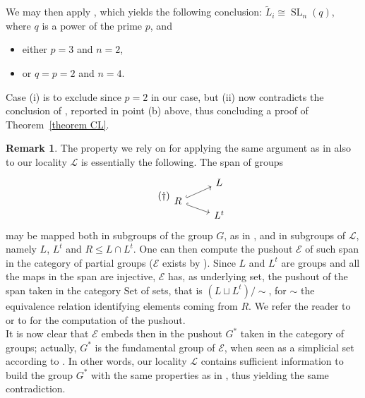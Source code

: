 \documentclass{amsart}
\numberwithin{equation}{section}
\theoremstyle{definition}
\newtheorem{remark}[equation]{Remark}
\theoremstyle{subresult}
\theoremstyle{caseresult}
\renewcommand{\L}{\mathcal{L}}
\newcommand{\SL}{\operatorname{SL}}
\newcommand{\wde}{\widetilde}
\newcommand{\<}{\langle}
\renewcommand{\>}{\rangle}
\begin{document}
We may then apply \cite[Main Theorem]{Parmeggiani:2009II}, which yields the following conclusion: $\wde{L}_i \cong \SL_n(q)$, where $q$ is a power of the prime $p$, and
\begin{itemize}
	\item[(i)] either $p=3$ and $n=2$,
	\item[(ii)] or $q=p=2$ and $n=4$.
\end{itemize}

Case (i) is to exclude since $p=2$ in our case, but (ii) now contradicts the conclusion of \cite[Lemma 3.23(a)]{Meier-Stell-Stroth:2012}, reported in point (b) above, thus concluding a proof of Theorem~\ref{theorem CL}.

\begin{remark}
	The property we rely on for applying the same argument as in \cite{Meier-Stell-Stroth:2012} also to our locality $\L$ is essentially  the following. The span of groups
	\begin{equation*}
		\label{eq:pushout span for orthogonal case}
		\tag{$\dagger$}
		\begin{tikzcd}[row sep=tiny]
				& L \\
			R \ar[ru,hook] \ar[rd,hook]		\\[-5pt]
				& L^t
		\end{tikzcd}
	\end{equation*}
	may be mapped both in subgroups of the group $G$, as in \cite{Meier-Stell-Stroth:2012}, and in subgroups of $\L$, namely $L$, $L^t$ and $R \le L \cap L^t$. One can then compute the pushout $\mathcal{E}$ of such span in the category of partial groups ($\mathcal{E}$ exists by \cite[Theorem A]{Salati:2023}). Since $L$ and $L^t$ are groups and all the maps in the span are injective, $\mathcal{E}$ has, as underlying set, the pushout of the span taken in the category $\mathrm{Set}$ of sets, that is $(L \sqcup L^t) / \sim$, for $\sim$ the equivalence relation identifying elements coming from $R$. We refer the reader to \cite{Salati:2023} or to \cite{Hackney-Lynd:2025} for the computation of the pushout.\\
	It is now clear that $\mathcal{E}$ embeds then in the pushout $G^*$ taken in the category of groups; actually, $G^*$ is the fundamental group of $\mathcal{E}$, when seen as a simplicial set according to \cite{Hackney-Lynd:2025}. In other words, our locality $\L$ contains sufficient information to build the group $G^*$ with the same properties as in \cite{Meier-Stell-Stroth:2012}, thus yielding the same contradiction. 
\end{remark} 
\end{document}
